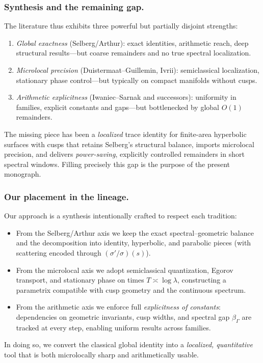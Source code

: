 \subsubsection*{Synthesis and the remaining gap.}
The literature thus exhibits three powerful but partially disjoint strengths:
\begin{enumerate}[label=\alph*)]
  \item \emph{Global exactness} (Selberg/Arthur): exact identities, arithmetic reach,
  deep structural results—but coarse remainders and no true spectral localization.
  \item \emph{Microlocal precision} (Duistermaat–Guillemin, Ivrii): semiclassical
  localization, stationary phase control—but typically on compact manifolds without
  cusps.
  \item \emph{Arithmetic explicitness} (Iwaniec–Sarnak and successors): uniformity in
  families, explicit constants and gaps—but bottlenecked by global $O(1)$ remainders.
\end{enumerate}
The missing piece has been a \emph{localized} trace identity for finite-area
hyperbolic surfaces with cusps that retains Selberg’s structural balance, imports
microlocal precision, and delivers \emph{power-saving}, explicitly controlled
remainders in short spectral windows. Filling precisely this gap is the purpose of the
present monograph.

\subsubsection*{Our placement in the lineage.}
Our approach is a synthesis intentionally crafted to respect each tradition:
\begin{itemize}
  \item From the Selberg/Arthur axis we keep the exact spectral–geometric balance and
  the decomposition into identity, hyperbolic, and parabolic pieces (with scattering
  encoded through $(\sigma'/\sigma)(s)$).
  \item From the microlocal axis we adopt semiclassical quantization, Egorov
  transport, and stationary phase on times $T\asymp\log\lambda$, constructing a
  parametrix compatible with cusp geometry and the continuous spectrum.
  \item From the arithmetic axis we enforce full \emph{explicitness of constants}:
  dependencies on geometric invariants, cusp widths, and spectral gap $\beta_\Gamma$
  are tracked at every step, enabling uniform results across families.
\end{itemize}
In doing so, we convert the classical global identity into a \emph{localized, quantitative}
tool that is both microlocally sharp and arithmetically usable.

